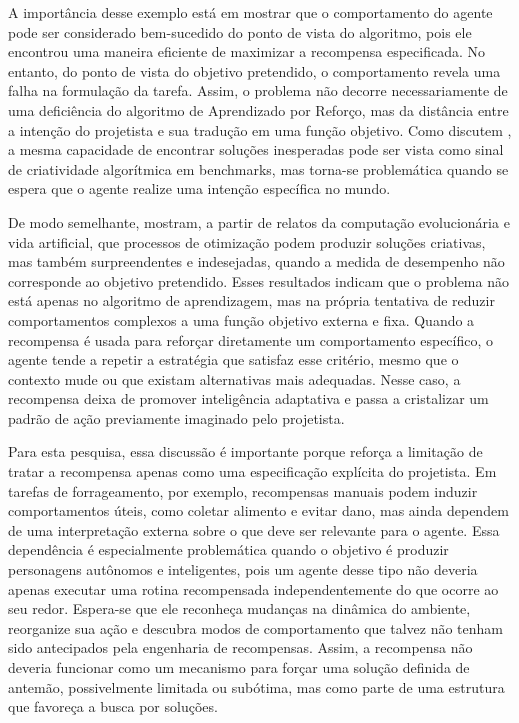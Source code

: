 A importância desse exemplo está em mostrar que o comportamento do agente pode ser considerado bem-sucedido do ponto de vista do algoritmo, pois ele encontrou uma maneira eficiente de maximizar a recompensa especificada. No entanto, do ponto de vista do objetivo pretendido, o comportamento revela uma falha na formulação da tarefa. Assim, o problema não decorre necessariamente de uma deficiência do algoritmo de Aprendizado por Reforço, mas da distância entre a intenção do projetista e sua tradução em uma função objetivo. Como discutem , a mesma capacidade de encontrar soluções inesperadas pode ser vista como sinal de criatividade algorítmica em benchmarks, mas torna-se problemática quando se espera que o agente realize uma intenção específica no mundo.

De modo semelhante,  mostram, a partir de relatos da computação evolucionária e vida artificial, que processos de otimização podem produzir soluções criativas, mas também surpreendentes e indesejadas, quando a medida de desempenho não corresponde ao objetivo pretendido. Esses resultados indicam que o problema não está apenas no algoritmo de aprendizagem, mas na própria tentativa de reduzir comportamentos complexos a uma função objetivo externa e fixa. Quando a recompensa é usada para reforçar diretamente um comportamento específico, o agente tende a repetir a estratégia que satisfaz esse critério, mesmo que o contexto mude ou que existam alternativas mais adequadas. Nesse caso, a recompensa deixa de promover inteligência adaptativa e passa a cristalizar um padrão de ação previamente imaginado pelo projetista.

Para esta pesquisa, essa discussão é importante porque reforça a limitação de tratar a recompensa apenas como uma especificação explícita do projetista. Em tarefas de forrageamento, por exemplo, recompensas manuais podem induzir comportamentos úteis, como coletar alimento e evitar dano, mas ainda dependem de uma interpretação externa sobre o que deve ser relevante para o agente. Essa dependência é especialmente problemática quando o objetivo é produzir personagens autônomos e inteligentes, pois um agente desse tipo não deveria apenas executar uma rotina recompensada independentemente do que ocorre ao seu redor. Espera-se que ele reconheça mudanças na dinâmica do ambiente, reorganize sua ação e descubra modos de comportamento que talvez não tenham sido antecipados pela engenharia de recompensas. Assim, a recompensa não deveria funcionar como um mecanismo para forçar uma solução definida de antemão, possivelmente limitada ou subótima, mas como parte de uma estrutura que favoreça a busca por soluções.

